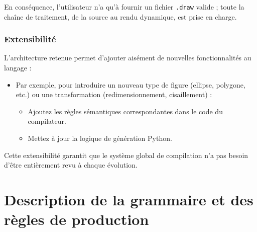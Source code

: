 \documentclass[12pt,a4paper]{article}
\begin{document}
En conséquence, l’utilisateur n’a qu’à fournir un fichier \texttt{.draw} valide ; toute la chaîne de traitement, de la source au rendu dynamique, est prise en charge.

\subsubsection{Extensibilité}
L’architecture retenue permet d’ajouter aisément de nouvelles fonctionnalités au langage :
\begin{itemize}
    \item Par exemple, pour introduire un nouveau type de figure (ellipse, polygone, etc.) ou une transformation (redimensionnement, cisaillement) :
    \begin{itemize}
        \item Ajoutez les règles sémantiques correspondantes dans le code du compilateur.
        \item Mettez à jour la logique de génération Python.
    \end{itemize}
\end{itemize}

Cette extensibilité garantit que le système global de compilation n’a pas besoin d’être entièrement revu à chaque évolution.

\newpage
\section{Description de la grammaire et des règles de production}
\end{document}
